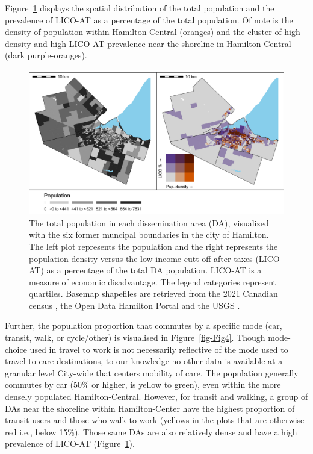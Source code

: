\documentclass[
  authoryear,
  preprint,
  3p]{elsarticle}
\begin{document}
Figure~\ref{fig-Fig3} displays the spatial distribution of the total
population and the prevalence of LICO-AT as a percentage of the total
population. Of note is the density of population within Hamilton-Central
(oranges) and the cluster of high density and high LICO-AT prevalence
near the shoreline in Hamilton-Central (dark purple-oranges).

\begin{figure}

{\centering \includegraphics[width=6.25in,height=\textheight]{figures/Fig3-plot_pops.png}

}

\caption{\label{fig-Fig3}The total population in each dissemination area
(DA), visualized with the six former muncipal boundaries in the city of
Hamilton. The left plot represents the population and the right
represents the population density versus the low-income cutt-off after
taxes (LICO-AT) as a percentage of the total DA population. LICO-AT is a
measure of economic disadvantage. The legend categories represent
quartiles. Basemap shapefiles are retrieved from the 2021 Canadian
census \citep{governmentofcanadaCensusPopulation2023}, the Open Data
Hamilton Portal \citep{opendatahamiltonCityBoundary2023} and the USGS
\citep{greatlakesUSGS2010}.}

\end{figure}

Further, the population proportion that commutes by a specific mode
(car, transit, walk, or cycle/other) is visualised in
Figure~\ref{fig-Fig4}. Though mode-choice used in travel to work is not
necessarily reflective of the mode used to travel to care destinations,
to our knowledge no other data is available at a granular level
City-wide that centers mobility of care. The population generally
commutes by car (50\% or higher, is yellow to green), even within the
more densely populated Hamilton-Central. However, for transit and
walking, a group of DAs near the shoreline within Hamilton-Center have
the highest proportion of transit users and those who walk to work
(yellows in the plots that are otherwise red i.e., below 15\%). Those
same DAs are also relatively dense and have a high prevalence of LICO-AT
(Figure~\ref{fig-Fig3}).
\end{document}
